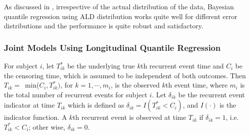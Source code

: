 As discussed in \cite{yu2001bayesian}, irrespective of the actual distribution of the data, Bayesian quantile regression using ALD distribution works quite well for different error distributions and the performance is quite robust and satisfactory.

\subsubsection{Joint Models Using Longitudinal Quantile Regression}

For subject $i$, let $T_{ik}^*$ be the underlying true $k$th recurrent event time and $C_i$ be the censoring time, which is assumed to be independent of both outcomes. Then $T_{ik} = $\mbox{ min}($C_i, T_{ik}^*)$, for $k=1, \cdots, m_i$, is the observed $k$th event time, where $m_i$ is the total number of recurrent events for subject $i$. Let $\delta_{ik}$ be the recurrent event indicator at time $T_{ik}$ which is defined as $\delta_{ik} = I(T_{ik}^* < C_i)$, and $I(\cdot)$ is the indicator function. A $k$th recurrent event is observed at time $T_{ik}$ if $\delta_{ik}=1$, i.e. $T_{ik}^* < C_i$; other wise, $\delta_{ik}=0$.

